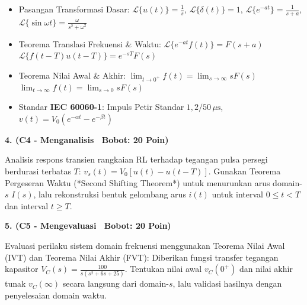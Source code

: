 \documentclass[10pt,a4paper]{article}
\begin{document}
\vfill

\begin{tcolorbox}[colback=unibblue!3,colframe=unibblue,colbacktitle=unibblue,coltitle=white,boxrule=0.6pt,arc=2pt,left=6pt,right=6pt,top=3pt,bottom=3pt,title=\textbf{\scriptsize FORMULA RUJUKAN TEKNIS \& STANDAR INDUSTRI TERKAIT}]
  \scriptsize
  \begin{itemize}[leftmargin=*, nosep]
  \item Pasangan Transformasi Dasar: $\mathcal{L}\{u(t)\} = \frac{1}{s}$, $\mathcal{L}\{\delta(t)\} = 1$, $\mathcal{L}\{e^{-at}\} = \frac{1}{s+a}$, $\mathcal{L}\{\sin\omega t\} = \frac{\omega}{s^2+\omega^2}$
  \item Teorema Translasi Frekuensi \& Waktu: $\mathcal{L}\{e^{-at} f(t)\} = F(s+a)$ \quad\textbar\quad $\mathcal{L}\{f(t-T)u(t-T)\} = e^{-sT} F(s)$
  \item Teorema Nilai Awal \& Akhir: $\lim_{t\to 0^+} f(t) = \lim_{s\to\infty} s F(s)$ \quad\textbar\quad $\lim_{t\to\infty} f(t) = \lim_{s\to 0} s F(s)$
  \item Standar \textbf{IEC 60060-1}: Impuls Petir Standar $1{,}2/50\,\mu\text{s}$, $v(t) = V_0(e^{-\alpha t} - e^{-\beta t})$
\end{itemize}
\end{tcolorbox}

\newpage

\par
\vspace{1mm}

\noindent\textbf{4. (C4 - Menganalisis \textbar\ Bobot: 20 Poin)}\par\vspace{0.8mm}
{\footnotesize Analisis respons transien rangkaian RL terhadap tegangan pulsa persegi berdurasi terbatas $T$: $v_s(t) = V_0 [u(t) - u(t-T)]$. Gunakan Teorema Pergeseran Waktu (*Second Shifting Theorem*) untuk menurunkan arus domain-$s$ $I(s)$, lalu rekonstruksi bentuk gelombang arus $i(t)$ untuk interval $0 \le t < T$ dan interval $t \ge T$.}\par

\vspace{3.5mm}

\noindent\textbf{5. (C5 - Mengevaluasi \textbar\ Bobot: 20 Poin)}\par\vspace{0.8mm}
{\footnotesize Evaluasi perilaku sistem domain frekuensi menggunakan Teorema Nilai Awal (IVT) dan Teorema Nilai Akhir (FVT): Diberikan fungsi transfer tegangan kapasitor $V_C(s) = \frac{100}{s(s^2 + 6s + 25)}$. Tentukan nilai awal $v_C(0^+)$ dan nilai akhir tunak $v_C(\infty)$ secara langsung dari domain-$s$, lalu validasi hasilnya dengan penyelesaian domain waktu.}\par
\end{document}
